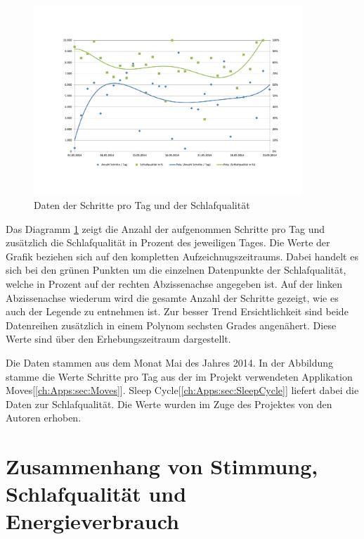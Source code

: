 \begin{figure}[H]
\centering
        \includegraphics[angle=270,width=0.9\textwidth]{images/Analyse/Sleep-Steps} 
        \caption[Daten der Schritte pro Tag und der Schlafqualität]{Daten der Schritte pro Tag und der Schlafqualität}
        \label{fig:ZusammenhangSchlafqualitätProSchrittenAmTag}
\end{figure}

Das Diagramm \ref{fig:ZusammenhangSchlafqualitätProSchrittenAmTag} zeigt die Anzahl der aufgenommen Schritte pro Tag und zusätzlich die Schlafqualität in Prozent des jeweiligen Tages.
Die Werte der Grafik beziehen sich auf den kompletten Aufzeichnugszeitraums. 
Dabei handelt es sich bei den grünen Punkten um die einzelnen Datenpunkte der Schlafqualität, welche in Prozent auf der rechten Abzissenachse angegeben ist.
Auf der linken Abzissenachse wiederum wird die gesamte Anzahl der Schritte gezeigt, wie es auch der Legende zu entnehmen ist.
Zur besser Trend Ersichtlichkeit sind beide Datenreihen zusätzlich in einem Polynom sechsten Grades angenähert.
Diese Werte sind über den Erhebungszeitraum dargestellt.

Die Daten stammen aus dem Monat Mai des Jahres 2014.
In der Abbildung stamme die Werte Schritte pro Tag aus der im Projekt verwendeten Applikation Moves[\ref{ch:Apps:sec:Moves}]. 
Sleep Cycle[\ref{ch:Apps:sec:SleepCycle}] liefert dabei die Daten zur Schlafqualität.
Die Werte wurden im Zuge des Projektes von den Autoren erhoben.



\section{Zusammenhang von Stimmung, Schlafqualität und Energieverbrauch}
\label{ch:AnalyseUndEvaluierung:sec:KorrelationVonSchlafqualitätUndSchrittenAmTag}

